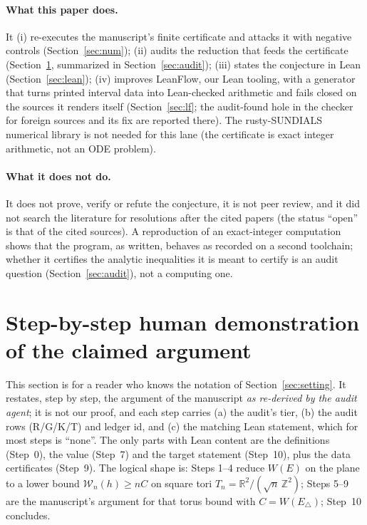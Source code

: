 \documentclass[10pt]{article}
\newcommand{\R}{\mathbb{R}}
\begin{document}
\paragraph{What this paper does.} It (i) re-executes the manuscript's finite certificate and attacks it with negative controls
(Section~\ref{sec:num}); (ii) audits the reduction that feeds the certificate (Section~\ref{sec:human}, summarized in
Section~\ref{sec:audit}); (iii) states the conjecture in Lean (Section~\ref{sec:lean}); (iv) improves LeanFlow, our Lean tooling,
with a generator that turns printed interval data into Lean-checked arithmetic and fails closed on the sources it renders itself (Section~\ref{sec:lf}; the audit-found hole in the checker for foreign sources and its fix are reported there). The
rusty-SUNDIALS numerical library is not needed for this lane (the certificate is exact integer arithmetic, not an ODE problem).
\paragraph{What it does not do.} It does not prove, verify or refute the conjecture, it is not peer review, and it did not search
the literature for resolutions after the cited papers (the status ``open'' is that of the cited sources). A reproduction of an
exact-integer computation shows that the program, as written, behaves as recorded on a second toolchain; whether it certifies
the analytic inequalities it is meant to certify is an audit question (Section~\ref{sec:audit}), not a computing one.

\section{Step-by-step human demonstration of the claimed argument}\label{sec:human}
This section is for a reader who knows the notation of Section~\ref{sec:setting}. It restates, step by step, the argument of
the manuscript \emph{as re-derived by the audit agent}; it is not our proof, and each step carries (a) the audit's tier, (b) the
audit rows (R/G/K/T) and ledger id, and (c) the matching Lean statement, which for most steps is ``none''. The only parts
with Lean content are the definitions (Step~0), the value (Step~7) and the target statement (Step~10), plus the data certificates (Step~9).
The logical shape is: Steps 1--4 reduce $W(E)$ on the plane to a lower bound $\mathcal W_n(h)\ge nC$ on square tori $T_n=\R^2/(\sqrt n\,\mathbb Z^2)$; Steps 5--9 are the manuscript's argument for that torus bound with
$C=W(E_\triangle)$; Step~10 concludes.
\end{document}
